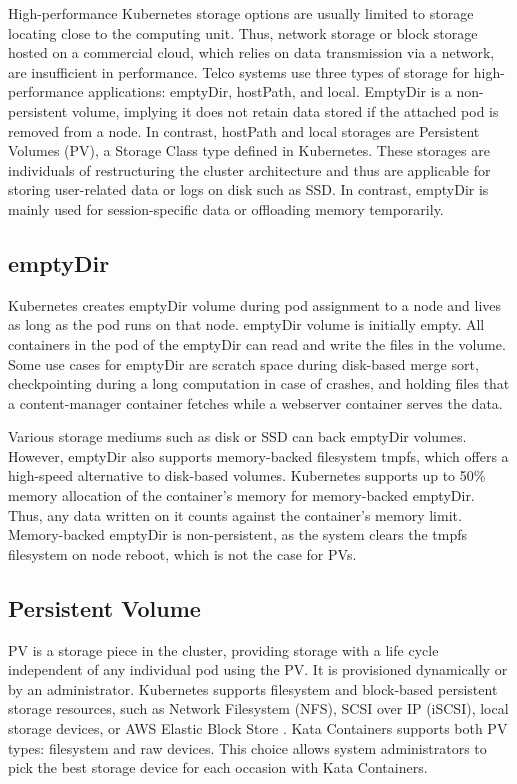 High-performance Kubernetes storage options are usually limited to storage locating close to the computing unit. Thus, network storage or block storage hosted on a commercial cloud, which relies on data transmission via a network, are insufficient in performance. Telco systems use three types of storage for high-performance applications: emptyDir, hostPath, and local. EmptyDir is a non-persistent volume, implying it does not retain data stored if the attached pod is removed from a node. In contrast, hostPath and local storages are Persistent Volumes (PV), a Storage Class type defined in Kubernetes. These storages are individuals of restructuring the cluster architecture and thus are applicable for storing user-related data or logs on disk such as SSD. In contrast, emptyDir is mainly used for session-specific data or offloading memory temporarily.

\subsection{emptyDir}

Kubernetes creates emptyDir volume during pod assignment to a node and lives as long as the pod runs on that node. emptyDir volume is initially empty. All containers in the pod of the emptyDir can read and write the files in the volume. Some use cases for emptyDir are scratch space during disk-based merge sort, checkpointing during a long computation in case of crashes, and holding files that a content-manager container fetches while a webserver container serves the data. \cite{VolumesKubernetes}

Various storage mediums such as disk or SSD can back emptyDir volumes. However, emptyDir also supports memory-backed filesystem tmpfs, which offers a high-speed alternative to disk-based volumes. Kubernetes supports up to 50\% memory allocation of the container's memory for memory-backed emptyDir. Thus, any data written on it counts against the container's memory limit. Memory-backed emptyDir is non-persistent, as the system clears the tmpfs filesystem on node reboot, which is not the case for PVs. \cite{VolumesKubernetes}

\subsection{Persistent Volume}

PV is a storage piece in the cluster, providing storage with a life cycle independent of any individual pod using the PV. It is provisioned dynamically or by an administrator. Kubernetes supports filesystem and block-based persistent storage resources, such as Network Filesystem (NFS), SCSI over IP (iSCSI), local storage devices, or AWS Elastic Block Store \cite{AmazonEBS}. Kata Containers supports both PV types: filesystem and raw devices. This choice allows system administrators to pick the best storage device for each occasion with Kata Containers. \cite{PV}

